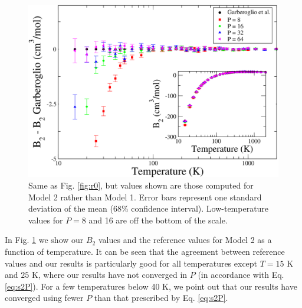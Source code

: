                 \begin{figure}[!htbp]
                    \centering
                    \includegraphics[scale=0.20,keepaspectratio]{Chapter-4/Figures/s2GarberoglioAll.png}
                    \caption{Same as Fig. \ref{fig:r0}, but values shown are those computed for Model 2 rather than Model 1. Error bars represent one standard deviation of the mean (68\% confidence interval). Low-temperature values for $P = 8$ and 16 are off the bottom of the scale.}
                    \label{fig:rT}
                \end{figure}
                In Fig. \ref{fig:rT} we show our $B_2$ values and the reference values for Model 2 as a function of temperature. It can be seen that the agreement between reference values and our results is particularly good for all temperatures except $T = 15$ K and $25$ K, where our results have not converged in $P$ (in accordance with Eq. \eqref{eq:s2P}). For a few temperatures below 40 K, we point out that our results have converged using fewer $P$ than that prescribed by Eq. \eqref{eq:s2P}.

